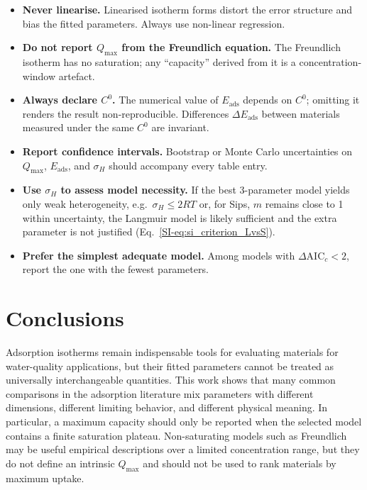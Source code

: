 \documentclass[journal=jacsat,manuscript=article]{achemso}
\begin{document}
	\begin{itemize}
		\item \textbf{Never linearise.} Linearised isotherm forms distort the error structure and bias the fitted parameters. Always use non-linear regression.
		\item \textbf{Do not report $Q_{\max}$ from the Freundlich equation.} The Freundlich isotherm has no saturation; any ``capacity'' derived from it is a concentration-window artefact.
		\item \textbf{Always declare $C^{0}$.} The numerical value of $E_{\mathrm{ads}}$ depends on $C^{0}$; omitting it renders the result non-reproducible. Differences $\Delta E_{\mathrm{ads}}$ between materials measured under the same $C^{0}$ are invariant.
		\item \textbf{Report confidence intervals.} Bootstrap or Monte Carlo uncertainties on $Q_{\max}$, $E_{\mathrm{ads}}$, and $\sigma_H$ should accompany every table entry.
		\item \textbf{Use $\sigma_H$ to assess model necessity.} If the best 3-parameter model yields only weak heterogeneity, e.g.\ $\sigma_H \leq 2RT$ or, for Sips, $m$ remains close to 1 within uncertainty, the Langmuir model is likely sufficient and the extra parameter is not justified (Eq.~\ref{SI-eq:si_criterion_LvsS}).
		\item \textbf{Prefer the simplest adequate model.} Among models with $\Delta\mathrm{AIC}_c < 2$, report the one with the fewest parameters.
	\end{itemize}

	\section{Conclusions}
	\label{sec:conclusions}

	
	Adsorption isotherms remain indispensable tools for evaluating materials for water-quality applications, but their fitted parameters cannot be treated as universally interchangeable quantities. This work shows that many common comparisons in the adsorption literature mix parameters with different dimensions, different limiting behavior, and different physical meaning. In particular, a maximum capacity should only be reported when the selected model contains a finite saturation plateau. Non-saturating models such as Freundlich may be useful empirical descriptions over a limited concentration range, but they do not define an intrinsic \(Q_{\max}\) and should not be used to rank materials by maximum uptake.
	
\end{document}
